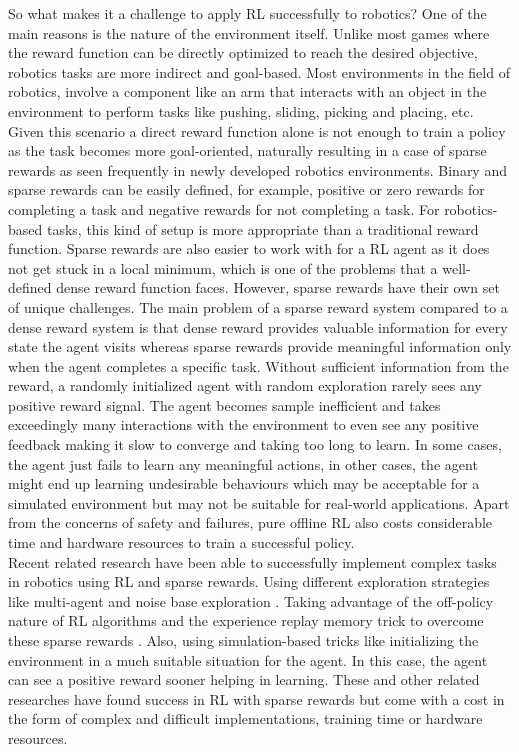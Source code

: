 So what makes it a challenge to apply RL successfully to robotics? One of the main reasons is the nature of the environment itself. Unlike most games where the reward function can be directly optimized to reach the desired objective, robotics tasks are more indirect and goal-based. Most environments in the field of robotics, involve a component like an arm that interacts with an object in the environment to perform tasks like pushing, sliding, picking and placing, etc. Given this scenario a direct reward function alone is not enough to train a policy as the task becomes more goal-oriented, naturally resulting in a case of sparse rewards as seen frequently in newly developed robotics environments. Binary and sparse rewards can be easily defined, for example, positive or zero rewards for completing a task and negative rewards for not completing a task. For robotics-based tasks, this kind of setup is more appropriate than a traditional reward function. Sparse rewards are also easier to work with for a RL agent as it does not get stuck in a local minimum, which is one of the problems that a well-defined dense reward function faces. However, sparse rewards have their own set of unique challenges. The main problem of a sparse reward system compared to a dense reward system is that dense reward provides valuable information for every state the agent visits whereas sparse rewards provide meaningful information only when the agent completes a specific task. Without sufficient information from the reward, a randomly initialized agent with random exploration rarely sees any positive reward signal. The agent becomes sample inefficient and takes exceedingly many interactions with the environment to even see any positive feedback making it slow to converge and taking too long to learn. In some cases, the agent just fails to learn any meaningful actions, in other cases, the agent might end up learning undesirable behaviours which may be acceptable for a simulated environment but may not be suitable for real-world applications. Apart from the concerns of safety and failures, pure offline RL also costs considerable time and hardware resources to train a successful policy. \\

Recent related research \cite{plappert2018multigoal} have been able to successfully implement complex tasks in robotics using RL and sparse rewards. Using different exploration strategies like multi-agent and noise base exploration \cite{lanier2019curiositydriven}. Taking advantage of the off-policy nature of RL algorithms and the experience replay memory trick to overcome these sparse rewards \cite{andrychowicz2018hindsight}. Also, using simulation-based tricks like initializing the environment in a much suitable situation for the agent. In this case, the agent can see a positive reward sooner helping in learning. These and other related researches have found success in RL with sparse rewards but come with a cost in the form of complex and difficult implementations, training time or hardware resources. \\

